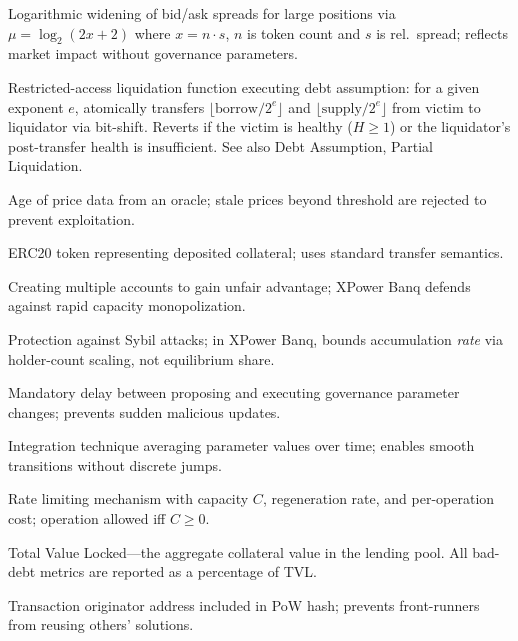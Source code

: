 \documentclass[10pt,a4paper,twocolumn]{article}
\theoremstyle{definition}
\theoremstyle{plain}
\theoremstyle{remark}
\begin{document}
\begin{description}[style=nextline, leftmargin=2.5em, labelindent=0em, font=\normalfont\bfseries]
\item[Spread Scaling] Logarithmic widening of bid/ask spreads for large positions via $\mu = \log_2(2x + 2)$ where $x = n \cdot s$, $n$ is token count and $s$ is rel.\ spread; reflects market impact without governance parameters.

\item[Square] Restricted-access liquidation function executing debt assumption: for a given exponent $e$, atomically transfers $\lfloor\text{borrow}/2^e\rfloor$ and $\lfloor\text{supply}/2^e\rfloor$ from victim to liquidator via bit-shift. Reverts if the victim is healthy ($H \geq 1$) or the liquidator's post-transfer health is insufficient. See also Debt Assumption, Partial Liquidation.

\item[Staleness] Age of price data from an oracle; stale prices beyond threshold are rejected to prevent exploitation.

\item[Supply Position] ERC20 token representing deposited collateral; uses standard transfer semantics.

\item[Sybil Attack] Creating multiple accounts to gain unfair advantage; XPower Banq defends against rapid capacity monopolization.

\item[Sybil Resistance] Protection against Sybil attacks; in XPower Banq, bounds accumulation \emph{rate} via holder-count scaling, not equilibrium share.


\item[Time-lock] Mandatory delay between proposing and executing governance parameter changes; prevents sudden malicious updates.

\item[Time-Weighted Mean] Integration technique averaging parameter values over time; enables smooth transitions without discrete jumps.

\item[Token Bucket] Rate limiting mechanism with capacity $C$, regeneration rate, and per-operation cost; operation allowed iff $C \geq 0$.

\item[TVL\,$\dagger$] Total Value Locked---the aggregate collateral value in the lending pool. All bad-debt metrics are reported as a percentage of TVL.

\item[tx.origin] Transaction originator address included in PoW hash; prevents front-runners from reusing others' solutions.


\end{description}
\end{document}
